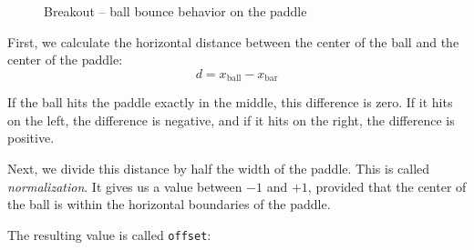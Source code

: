 \begin{figure}
	\begin{center}
	\caption{Breakout -- ball bounce behavior on the paddle}
	\label{picBreakoutBouncePaddle}
	\end{center}
\end{figure}


First, we calculate the horizontal distance between the center of the ball and the center of the paddle:
\[
	d = x_{\text{ball}} - x_{\text{bar}}
\]

If the ball hits the paddle exactly in the middle, this difference is zero. If it hits on the left, the difference is negative, and if it hits on the right, the difference is positive.

Next, we divide this distance by half the width of the paddle. This is called \emph{normalization}. It gives us a value between $-1$ and $+1$, provided that the center of the ball is within the horizontal boundaries of the paddle.

The resulting value is called \texttt{offset}:

